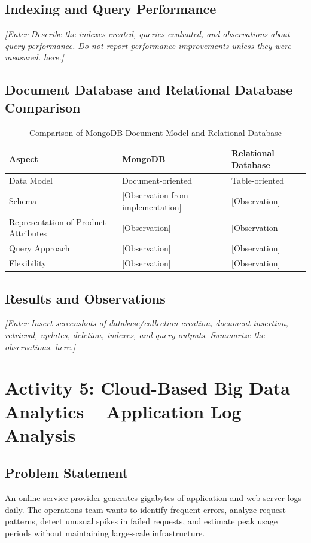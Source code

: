 \documentclass[12pt,a4paper]{report}
\newcommand{\placeholder}[1]{\textit{[Enter #1 here.]}}
\newcommand{\activityheading}[2]{%
  \section{Activity #1: #2}%
}
\begin{document}
\subsection{Indexing and Query Performance}
\placeholder{Describe the indexes created, queries evaluated, and
observations about query performance. Do not report performance
improvements unless they were measured.}

\subsection{Document Database and Relational Database Comparison}
\begin{table}[H]
\centering
\caption{Comparison of MongoDB Document Model and Relational Database}
\begin{tabularx}{\textwidth}{|l|X|X|}
\hline
\textbf{Aspect} & \textbf{MongoDB} & \textbf{Relational Database}\\
\hline
Data Model & Document-oriented & Table-oriented\\
\hline
Schema & [Observation from implementation] & [Observation]\\
\hline
Representation of Product Attributes & [Observation] & [Observation]\\
\hline
Query Approach & [Observation] & [Observation]\\
\hline
Flexibility & [Observation] & [Observation]\\
\hline
\end{tabularx}
\end{table}

\subsection{Results and Observations}
\placeholder{Insert screenshots of database/collection creation,
document insertion, retrieval, updates, deletion, indexes, and query
outputs. Summarize the observations.}

\clearpage
\activityheading{5}{Cloud-Based Big Data Analytics -- Application Log Analysis}

\subsection{Problem Statement}
An online service provider generates gigabytes of application and
web-server logs daily. The operations team wants to identify frequent
errors, analyze request patterns, detect unusual spikes in failed
requests, and estimate peak usage periods without maintaining
large-scale infrastructure.
\end{document}
